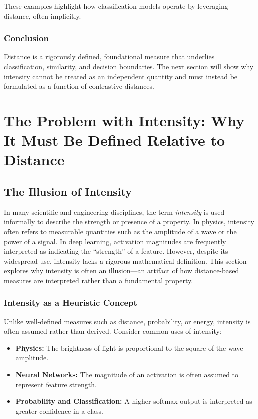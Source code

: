 \documentclass[12pt]{article}
\begin{document}
These examples highlight how classification models operate by leveraging distance, often implicitly.

\subsubsection{Conclusion}

Distance is a rigorously defined, foundational measure that underlies classification, similarity, and decision boundaries. The next section will show why intensity cannot be treated as an independent quantity and must instead be formulated as a function of contrastive distances.


\section{The Problem with Intensity: Why It Must Be Defined Relative to Distance}
\subsection{The Illusion of Intensity}

In many scientific and engineering disciplines, the term \textit{intensity} is used informally to describe the strength or presence of a property. In physics, intensity often refers to measurable quantities such as the amplitude of a wave or the power of a signal. In deep learning, activation magnitudes are frequently interpreted as indicating the “strength” of a feature. However, despite its widespread use, intensity lacks a rigorous mathematical definition. This section explores why intensity is often an illusion—an artifact of how distance-based measures are interpreted rather than a fundamental property.

\subsubsection{Intensity as a Heuristic Concept}

Unlike well-defined measures such as distance, probability, or energy, intensity is often assumed rather than derived. Consider common uses of intensity:

\begin{itemize}
    \item \textbf{Physics:} The brightness of light is proportional to the square of the wave amplitude.
    \item \textbf{Neural Networks:} The magnitude of an activation is often assumed to represent feature strength.
    \item \textbf{Probability and Classification:} A higher softmax output is interpreted as greater confidence in a class.
\end{itemize}
\end{document}
